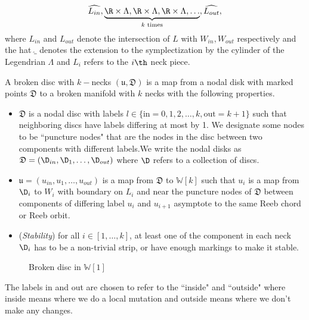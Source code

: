 $$\widehat{L_{in}}, \underbrace{ \R\times \Lambda,\R\times \Lambda,\R\times \Lambda,\dots  }_{\text {$k$ times}} , \widehat{L_{out}},$$
where $L_{in}$ and $L_{out}$ denote the intersection of $L$ with $W_{in},W_{out}$ respectively and the hat $\widehat\_$ denotes the extension to the symplectization by the cylinder of the Legendrian $\Lambda$ and
$L_i$ refers to the $i\th$ neck piece.

 \begin{defn}\label{def:brokdisc}
 
 A broken disc with $k-$necks $(\mathfrak{u,D})$ is a map from a  nodal disk with marked points $\mathfrak{D}$ to a broken manifold with $k$ necks with the following properties. 
 \begin{itemize}
     \item $\mathfrak{D}$ is a nodal disc with labels $l\in \{\text{in}=0,1,2,\dots,k,\text{out}=k+1\}$ such that neighboring discs have labels differing at most by 1. We designate some nodes to be ``puncture nodes" that are the nodes in the disc  between two components with different labels.We write the nodal disks as  $ \mathfrak{D} = (\D_{in},\D_1,\dots,\D_{out})$ where $\D$ refers to a collection of discs.
     \item  $ \mathfrak{u} = (u_{in},u_1,\dots,u_{out})$ is a map from $\mathfrak{D}$ to $\mathbb{W}[k]$ such that  $u_i$ is a map from $\D_i$ to $W_i$ with boundary on $L_i$ and near the puncture nodes of $\mathfrak{D}$ between components of differing label $u_i$ and $u_{i+1}$ asymptote to the same Reeb chord or Reeb orbit.
     \item (\textit{Stability}) for all $i \in [1,\dots,k]$, at least one of the component in each neck $\D_i$ has to be a non-trivial strip, or have enough markings to make it stable.
 \end{itemize}
  \end{defn}
\begin{figure}
    \centering
    \caption{Broken disc in $\mathbb{W}[1]$}
    \label{fig:my_label}
\end{figure} 

\begin{remark}
The labels in and out are chosen to refer to the ``inside" and ``outside" where inside means where we do a local mutation and outside means where we don't make any changes.
\end{remark}

